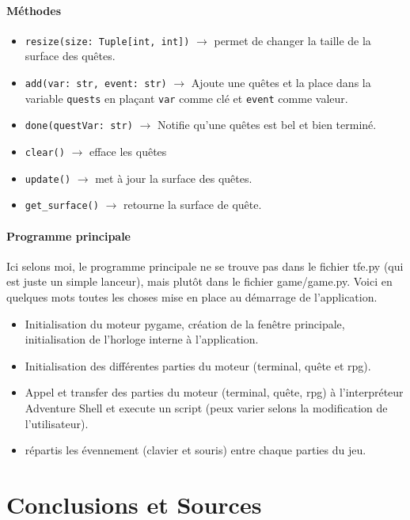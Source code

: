 \documentclass{report}
\begin{document}
\subsection*{Méthodes}
\begin{itemize}
  \item \texttt{resize(size: Tuple[int, int])} $\rightarrow$ permet de changer la taille de la surface des quêtes.
  \item \texttt{add(var: str, event: str)} $\rightarrow$ Ajoute une quêtes et la place dans la variable \texttt{quests} en plaçant \texttt{var} comme clé et \texttt{event} comme valeur.
  \item \texttt{done(questVar: str)} $\rightarrow$ Notifie qu'une quêtes est bel et bien terminé.
  \item \texttt{clear()} $\rightarrow$ efface les quêtes
  \item \texttt{update()} $\rightarrow$ met à jour la surface des quêtes.
  \item \texttt{get_surface()} $\rightarrow$ retourne la surface de quête.
 \end{itemize}

\subsection{Programme principale}
Ici selons moi, le programme principale ne se trouve pas dans le fichier tfe.py (qui est juste un simple lanceur), mais plutôt dans le fichier game/game.py. Voici en quelques mots toutes les choses mise en place au démarrage de l'application.

\begin{itemize}
  \item Initialisation du moteur pygame, création de la fenêtre principale, initialisation de l'horloge interne à l'application.
  \item Initialisation des différentes parties du moteur (terminal, quête et rpg).
  \item Appel et transfer des parties du moteur (terminal, quête, rpg) à l'interpréteur Adventure Shell et execute un script (peux varier selons la modification de l'utilisateur).
  \item répartis les évennement (clavier et souris) entre chaque parties du jeu.
\end{itemize}

\part{Conclusions et Sources}
\end{document}
